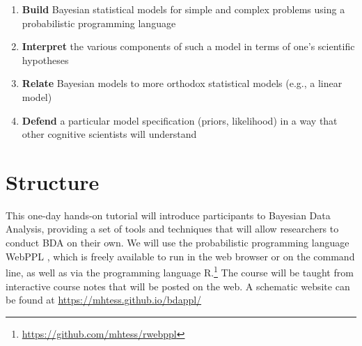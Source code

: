 \documentclass[10pt,letterpaper]{article}
\providecommand{\tightlist}{%
  \setlength{\itemsep}{0pt}\setlength{\parskip}{0pt}}
\begin{document}
\begin{enumerate}
\tightlist
\item \textbf{Build} Bayesian statistical models for simple and complex problems using a probabilistic programming language 
\item \textbf{Interpret} the various components of such a model in terms of one's scientific hypotheses 
\item \textbf{Relate} Bayesian models to more orthodox statistical models (e.g., a linear model) 
\item \textbf{Defend} a particular model specification (priors, likelihood) in a way that other cognitive scientists will understand
\end{enumerate}

\section{Structure}

This one-day hands-on tutorial will introduce participants to Bayesian Data Analysis, providing a set of tools and techniques that will allow researchers to conduct BDA on their own. 
We will use the probabilistic programming language WebPPL \cite{dippl}, which is freely available to run in the web browser or on the command line, as well as via the programming language R.\footnote{
\url{https://github.com/mhtess/rwebppl}
}
The course will be taught from interactive course notes that will be posted on the web. 
A schematic website can be found at \url{https://mhtess.github.io/bdappl/}
\end{document}
